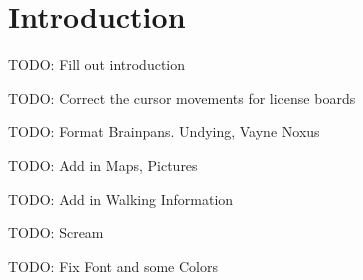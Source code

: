 \chapter{Introduction}

TODO: Fill out introduction

TODO: Correct the cursor movements for license boards

TODO: Format Brainpans. Undying, Vayne Noxus

TODO: Add in Maps, Pictures

TODO: Add in Walking Information

TODO: Scream

TODO: Fix Font and some Colors